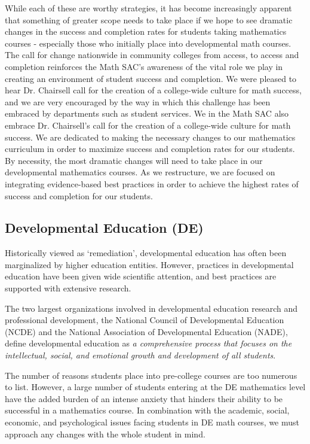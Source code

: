 While each of these are worthy strategies, it has become increasingly apparent
that something of greater scope needs to take place if we hope to see dramatic
changes in the success and completion rates for students taking mathematics
courses - especially those who initially place into developmental math courses.
The call for change nationwide in community colleges from access, to access and
completion reinforces the Math SAC's awareness of the vital role we play in
creating an environment of student success and completion.  We were pleased to
hear Dr. Chairsell call for the creation of a college-wide culture for math
success, and we are very encouraged by the way in which this challenge has been
embraced by departments such as student services.  We in the Math SAC also embrace
Dr. Chairsell's call for the creation of a college-wide culture for math
success. We are dedicated to making the necessary changes to our mathematics
curriculum in order to maximize success and completion rates for our students.
By necessity, the most dramatic changes will need to take place in our
developmental mathematics courses.  As we restructure, we are focused on
integrating evidence-based best practices in order to achieve the highest
rates of success and completion for our students. 

\subsection{Developmental Education (DE)}
Historically viewed as `remediation', developmental education has often
been marginalized by higher education entities.  However, practices in developmental
education have been given wide scientific attention, and best practices are supported with 
extensive research.

The two largest organizations involved in developmental education research and
professional development, the National Council of Developmental Education (NCDE) and
the National Association of Developmental Education (NADE), define developmental
education as \emph{a comprehensive process that focuses on the intellectual,
social, and emotional growth and development of all students}.

The number of reasons students place into pre-college courses are too numerous
to list. However, a large number of students entering at the DE mathematics
level have the added burden of an intense anxiety that hinders their ability to
be successful in a mathematics course.  In combination with the academic,
social, economic, and psychological issues facing students in DE math courses,
we must approach any changes with the whole student in mind.


